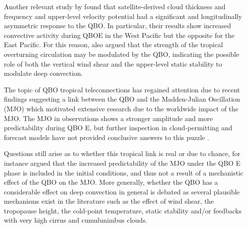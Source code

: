 Another relevant study by \cite{liess2012} found that satellite-derived cloud thickness and frequency  and upper-level velocity potential had a significant and longitudinally asymmetric response to the QBO. In particular, their results show increased convective activity during QBOE in the West Pacific but the opposite for the East Pacific.  For this reason, \cite{liess2012} also argued that the strength of the tropical overturning circulation may be modulated by the QBO, indicating the possible role of both the vertical wind shear and the upper-level static stability to modulate deep convection. 


The topic of QBO tropical teleconnections has regained attention due to recent findings suggesting a link between the QBO and the Madden-Julian Oscillation (MJO) \citep{son2017} which motivated extensive research \citep[see e.g.][]{lee2018,wang2019,martin2020jgr} due to the worldwide impact of the MJO.
 The MJO in observations shows a stronger amplitude and more predictability during QBO E, but further inspection in cloud-permitting and forecast models have not provided conclusive answers to this puzzle \citep{martin2019,martin2020jgr}. 
 
 Questions still arise as to whether this tropical link is real or due to chance, for instance \cite{wang2019} argued that the increased predictability of the MJO under the QBO E phase is included in the initial conditions, and thus not a result of a mechanistic effect of the QBO on the MJO. More generally, whether the QBO has a considerable effect on deep convection in general is debated as several plausible mechanisms exist in the literature \citep[see e.g.][]{nie2015} such as the effect of wind shear, the tropopause height, the cold-point temperature, static stability and/or feedbacks with very high cirrus and cumulunimbus clouds. 

